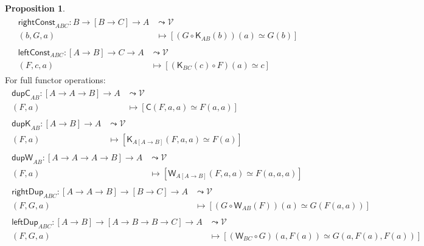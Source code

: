\documentclass[a4paper]{article}
\theoremstyle{definition}
\newtheorem{proposition}[definition]{Proposition}
\theoremstyle{remark}
\renewcommand{\equiv}{\simeq}
\newcommand{\V}{\mathcal{V}}
\newcommand{\nm}{\mathsf}
\newcommand{\combinator}{\nm}
\newcommand{\constFun}{\combinator{K}}
\newcommand{\swapFun}{\combinator{C}}
\newcommand{\dupFun}{\combinator{W}}
\begin{document}
\begin{proposition}
\begin{gather*}
    \begin{aligned}
      \nm{rightConst}_{ABC} : B \to [B \to C] \to A &\leadsto \V\\
                              (b,G,a)               &\mapsto  [(G \circ \constFun_{AB}(b))(a) \equiv G(b)]
    \end{aligned}\\[1ex]
    \begin{aligned}
      \nm{leftConst}_{ABC} : [A \to B] \to C \to A &\leadsto \V\\
                             (F,c,a)               &\mapsto  [(\constFun_{BC}(c) \circ F)(a) \equiv c]
    \end{aligned}
  \end{gather*}
  For full functor operations:
  \begin{gather*}
    \begin{aligned}
      \nm{dupC}_{AB} : [A \to A \to B] \to A &\leadsto \V\\
                       (F,a)                 &\mapsto  [\swapFun(F,a,a) \equiv F(a,a)]
    \end{aligned}\\[1ex]
    \begin{aligned}
      \nm{dupK}_{AB} : [A \to B] \to A &\leadsto \V\\
                       (F,a)           &\mapsto  [\constFun_{A[A{\to}B]}(F,a,a) \equiv F(a)]
    \end{aligned}\\[1ex]
    \begin{aligned}
      \nm{dupW}_{AB} : [A \to A \to A \to B] \to A &\leadsto \V\\
                       (F,a)                       &\mapsto  [\dupFun_{A[A{\to}B]}(F,a,a) \equiv F(a,a,a)]
    \end{aligned}\\[1ex]
    \begin{aligned}
      \nm{rightDup}_{ABC} : [A \to A \to B] \to [B \to C] \to A &\leadsto \V\\
                            (F,G,a)                             &\mapsto  [(G \circ \dupFun_{AB}(F))(a) \equiv G(F(a,a))]
    \end{aligned}\\[1ex]
    \begin{aligned}
      \nm{leftDup}_{ABC} : [A \to B] \to [A \to B \to B \to C] \to A &\leadsto \V\\
                           (F,G,a)                                   &\mapsto  [(\dupFun_{BC} \circ G)(a,F(a)) \equiv G(a,F(a),F(a))]
    \end{aligned}
  \end{gather*}
\end{proposition}
\end{document}
